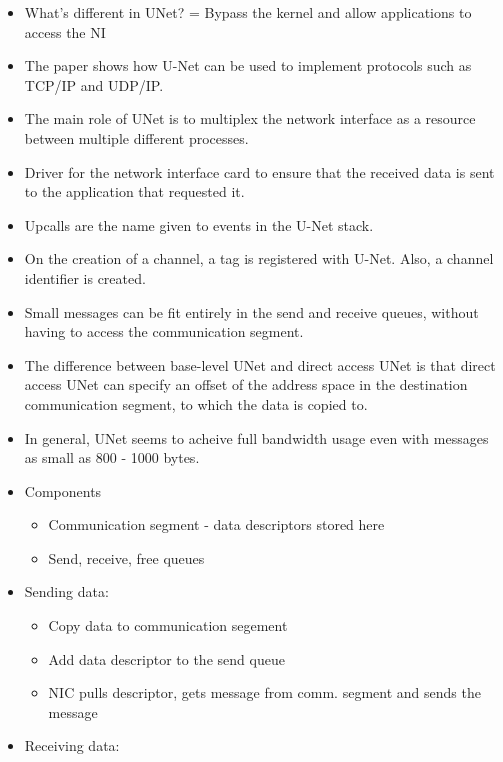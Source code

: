 \documentclass[a4paper]{article}
\begin{document}
\begin{itemize}
    \item 
    What's different in UNet? = Bypass the kernel and allow applications to access the NI
    \item 
    The paper shows how U-Net can be used to implement protocols such as TCP/IP and UDP/IP.
    \item
    The main role of UNet is to multiplex the network interface as a resource between multiple different processes.
    \item
    Driver for the network interface card to ensure that the received data is sent to the application that requested it.
    \item
    Upcalls are the name given to events in the U-Net stack.
    \item
    On the creation of a channel, a tag is registered with U-Net. Also, a channel identifier is created.
    \item 
    Small messages can be fit entirely in the send and receive queues, without having to access the communication segment.
    \item
    The difference between base-level UNet and direct access UNet is that direct access UNet can specify an offset of the address space in the destination communication segment, to which the data is copied to.
    \item 
    In general, UNet seems to acheive full bandwidth usage even with messages as small as 800 - 1000 bytes.
    \item
        Components
        \begin{itemize}
            \item
            Communication segment - data descriptors stored here
            \item
            Send, receive, free queues
        \end{itemize}
    \item
        Sending data:
        \begin{itemize}
            \item
            Copy data to communication segement
            \item
            Add data descriptor to the send queue
            \item
            NIC pulls descriptor, gets message from comm. segment and sends the message
        \end{itemize}
    \item
        Receiving data:
        \begin{itemize}

\end{itemize}
\end{itemize}
\end{document}
